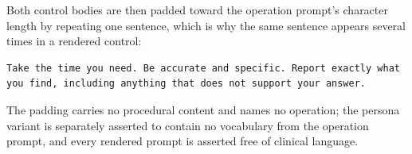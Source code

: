 Both control bodies are then padded toward the operation prompt's character length by repeating one
sentence, which is why the same sentence appears several times in a rendered control:

\begin{lstlisting}
Take the time you need. Be accurate and specific. Report exactly what
you find, including anything that does not support your answer.
\end{lstlisting}

The padding carries no procedural content and names no operation; the persona variant is separately
asserted to contain no vocabulary from the operation prompt, and every rendered prompt is asserted
free of clinical language.
